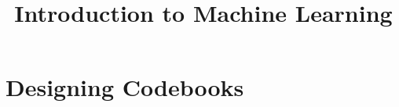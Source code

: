 



\newcommand{\titlefigure}{figure_man/hill-climbing.png}
\newcommand{\learninggoals}{
  \item \textcolor{blue}{Know what a cookbook is}
  \item \textcolor{blue}{Know how to define a good cookbook}
  \item \textcolor{blue}{Know what ECOC is}
  \item \textcolor{blue}{Know what the randomized hill-clmibing algorithm is}
}

\title{Introduction to Machine Learning}
\date{}








\sloppy

\section{Designing Codebooks}

